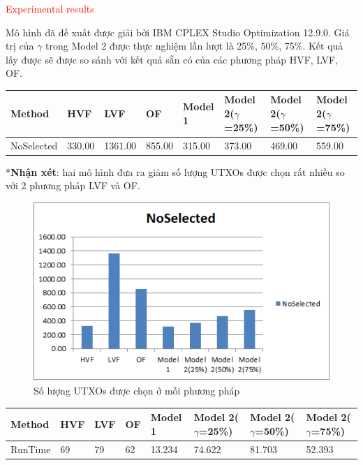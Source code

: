 \documentclass[a4paper]{article}
\begin{document}
\textcolor{red}{Experimental results}

Mô hình đã đề xuất được giải bởi IBM CPLEX Studio Optimization 12.9.0. Giá trị của $\gamma$ trong Model 2 được thực nghiệm lần lượt là 25\%, 50\%, 75\%. Kết quả lấy được sẽ được so sánh với kết quả sẵn có của các phương pháp HVF, LVF, OF.

\begin{table}[H]
	\begin{tabular}{|l|l|l|l|l|l|l|l|}
		\hline
		Method     & HVF    & LVF     & OF     & Model 1 & Model 2($\gamma$=25\%) & Model 2($\gamma$=50\%) & Model 2($\gamma$=75\%) \\ \hline
		NoSelected & 330.00 & 1361.00 & 855.00 & 315.00  & 373.00        & 469.00        & 559.00        \\ \hline
	\end{tabular}
\end{table}

*\textbf{Nhận xét}: hai mô hình đưa ra giảm  số lượng UTXOs được chọn rất nhiều so với 2 phương pháp LVF và OF. \\


\begin{center}
	\begin{figure} [H]
		\begin{center}
			\includegraphics[scale=1]{NoSelected}
		\end{center}
		\caption{Số lượng UTXOs được chọn ở mỗi phương pháp}
		\label{refhinh1}
	\end{figure}
\end{center}

\begin{table}[H]
	\begin{tabular}{|l|l|l|l|l|l|l|l|}
		\hline
		Method  & HVF & LVF & OF & Model 1 & Model 2($\gamma$=25\%) & Model 2($\gamma$=50\%) & Model 2($\gamma$=75\%) \\ \hline
		RunTime & 69  & 79  & 62 & 13.234  & 74.622        & 81.703        & 52.393        \\ \hline
	\end{tabular}
\end{table}
\end{document}
